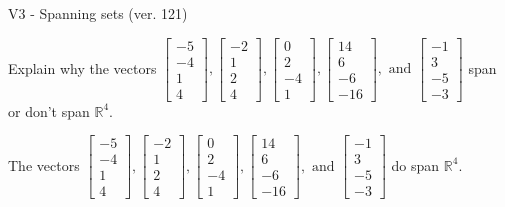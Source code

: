 \begin{exercise}
  \begin{exerciseTitle}V3 - Spanning sets (ver. 121)\end{exerciseTitle}
  \begin{exerciseStatement}
    Explain why the vectors \(\left[\begin{array}{r}
-5 \\
-4 \\
1 \\
4
\end{array}\right] , \left[\begin{array}{r}
-2 \\
1 \\
2 \\
4
\end{array}\right] , \left[\begin{array}{r}
0 \\
2 \\
-4 \\
1
\end{array}\right] , \left[\begin{array}{r}
14 \\
6 \\
-6 \\
-16
\end{array}\right] , \text{ and } \left[\begin{array}{r}
-1 \\
3 \\
-5 \\
-3
\end{array}\right]\) span or don't span \(\mathbb{R}^4\). 
	


  \end{exerciseStatement}
  \begin{exerciseAnswer}
   The vectors \(\left[\begin{array}{r}
-5 \\
-4 \\
1 \\
4
\end{array}\right] , \left[\begin{array}{r}
-2 \\
1 \\
2 \\
4
\end{array}\right] , \left[\begin{array}{r}
0 \\
2 \\
-4 \\
1
\end{array}\right] , \left[\begin{array}{r}
14 \\
6 \\
-6 \\
-16
\end{array}\right] , \text{ and } \left[\begin{array}{r}
-1 \\
3 \\
-5 \\
-3
\end{array}\right]\) 
  	 do  
	span \(\mathbb{R}^4\).
  



\end{exerciseAnswer}
\end{exercise}

